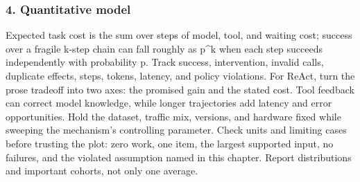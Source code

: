 \subsubsection*{4. Quantitative model}
Expected task cost is the sum over steps of model, tool, and waiting cost; success over a fragile k-step chain can fall roughly as p\textasciicircum{}k when each step succeeds independently with probability p. Track success, intervention, invalid calls, duplicate effects, steps, tokens, latency, and policy violations.
For ReAct, turn the prose tradeoff into two axes: the promised gain and the stated cost. Tool feedback can correct model knowledge, while longer trajectories add latency and error opportunities. Hold the dataset, traffic mix, versions, and hardware fixed while sweeping the mechanism's controlling parameter.
Check units and limiting cases before trusting the plot: zero work, one item, the largest supported input, no failures, and the violated assumption named in this chapter. Report distributions and important cohorts, not only one average.
